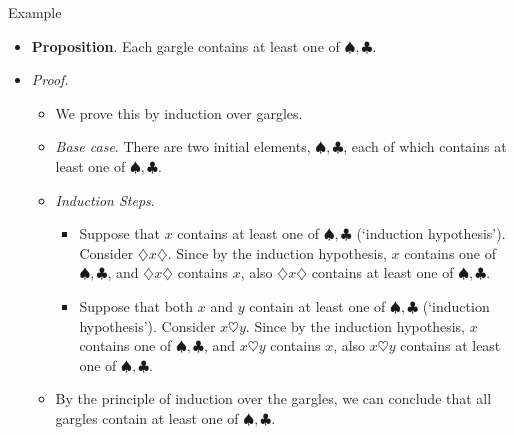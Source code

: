 \documentclass[../slides.tex]{subfiles}
\begin{document}
\begin{frame}{Example}

	\begin{itemize}

		\item \textbf{Proposition}. Each gargle contains at least one of $\spadesuit,\clubsuit$.
		
		\item \emph{Proof}.
		
			\begin{itemize}

				\item We prove this by induction over gargles.
				
				\item \emph{Base case}. There are two initial elements, $\spadesuit,\clubsuit$, each of which contains at least one of $\spadesuit,\clubsuit$.
				
				\item \emph{Induction Steps}. \begin{itemize}
				
					\item Suppose that $x$ contains at least one of $\spadesuit,\clubsuit$ (`induction hypothesis'). Consider $\diamondsuit x \diamondsuit$. Since by the induction hypothesis, $x$ contains one of $\spadesuit,\clubsuit$, and $\diamondsuit x \diamondsuit$ contains $x$, also $\diamondsuit x \diamondsuit$ contains at least one of $\spadesuit,\clubsuit$.
					
					\item Suppose that  both $x$ and $y$ contain at least one of $\spadesuit,\clubsuit$ (`induction hypothesis'). Consider $ x \heartsuit y$. Since by the induction hypothesis, $x$ contains one of $\spadesuit,\clubsuit$, and $x \heartsuit y$ contains $x$, also $x \heartsuit y$ contains at least one of $\spadesuit,\clubsuit$.

				
				\end{itemize}
				
				\item By the principle of induction over the gargles, we can conclude that all gargles contain at least one of $\spadesuit,\clubsuit$.

			\end{itemize}
	
	\end{itemize}

\end{frame}
\end{document}
